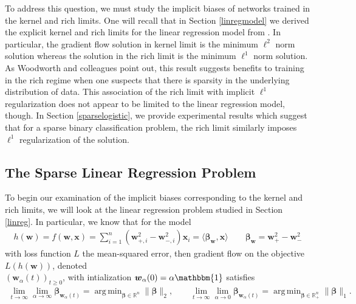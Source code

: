 \documentclass{article}
\DeclareMathOperator*{\argmin}{arg\,min}
\begin{document}
To address this question, we must study the implicit biases of networks trained in the kernel and rich limits. One will recall that in Section \ref{linregmodel} we derived the explicit kernel and rich limits for the linear regression model from \cite{woodworth2020kernel}. In particular, the gradient flow solution in kernel limit is the minimum $\ell^2$ norm solution whereas the solution in the rich limit is the minimum $\ell^1$ norm solution. As Woodworth and colleagues point out, this result suggests benefits to training in the rich regime when one suspects that there is sparsity in the underlying distribution of data. This association of the rich limit with implicit $\ell^1$ regularization does not appear to be limited to the linear regression model, though. In Section \ref{sparselogistic}, we provide experimental results which suggest that for a sparse binary classification problem, the rich limit similarly imposes $\ell^1$ regularization of the solution.

\subsection{The Sparse Linear Regression Problem}\label{sparselinear}

To begin our examination of the implicit biases corresponding to the kernel and rich limits, we will look at the linear regression problem studied in Section \ref{linreg}. In particular, we know that for the model
\begin{align*}
    h(\boldsymbol{w}) = f(\boldsymbol{w}, \boldsymbol{x}) = \sum_{i=1}^n(\boldsymbol{w}_{+, i}^2 - \boldsymbol{w}_{-, i}^2)\boldsymbol{x}_i = \langle \boldsymbol{\beta}_{\boldsymbol{w}}, \boldsymbol{x} \rangle \qquad \boldsymbol{\beta}_{\boldsymbol{w}} = \boldsymbol{w}_+^2 -\boldsymbol{w}_-^2
\end{align*}
with loss function $L$ the mean-squared error, then gradient flow on the objective $L(h(\boldsymbol{w}))$, denoted\\ $(\boldsymbol{w}_{\alpha}(t))_{t \geq 0}$, with intialization $\boldsymbol{w}_{\alpha}(0) = \alpha \mathbbm{1}$ satisfies
\begin{align*}
    \lim_{t \to \infty}\lim_{\alpha \to \infty} \boldsymbol{\beta}_{\boldsymbol{w}_{\alpha}(t)} = \argmin_{\boldsymbol{\beta} \in \mathbb{R}^n}  \| \boldsymbol{\beta} \|_2, \qquad 
    \lim_{t \to \infty}\lim_{\alpha \to 0} \boldsymbol{\beta}_{\boldsymbol{w}_{\alpha}(t)} = \argmin_{\boldsymbol{\beta} \in \mathbb{R}_+^n}  \| \boldsymbol{\beta} \|_1.
\end{align*}
\end{document}
